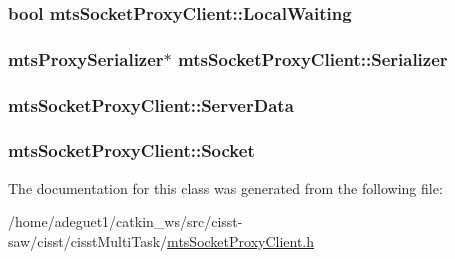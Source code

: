 \hypertarget{classmts_socket_proxy_client_ada937cdc99e0b2c41a569870908968b7}{
\subsubsection[{Local\-Waiting}]{\setlength{\rightskip}{0pt plus 5cm}bool mts\-Socket\-Proxy\-Client\-::\-Local\-Waiting\hspace{0.3cm}{\ttfamily [protected]}}}\label{classmts_socket_proxy_client_ada937cdc99e0b2c41a569870908968b7}
\hypertarget{classmts_socket_proxy_client_a3f2c24fb49a4fe8a38418792a607cab9}{
\subsubsection[{Serializer}]{\setlength{\rightskip}{0pt plus 5cm}mts\-Proxy\-Serializer$\ast$ mts\-Socket\-Proxy\-Client\-::\-Serializer\hspace{0.3cm}{\ttfamily [protected]}}}\label{classmts_socket_proxy_client_a3f2c24fb49a4fe8a38418792a607cab9}
\hypertarget{classmts_socket_proxy_client_aa9f989d86d2edd55f50c997b48ffcf74}{
\subsubsection[{Server\-Data}]{ mts\-Socket\-Proxy\-Client\-::\-Server\-Data\hspace{0.3cm}{\ttfamily [protected]}}}\label{classmts_socket_proxy_client_aa9f989d86d2edd55f50c997b48ffcf74}
\hypertarget{classmts_socket_proxy_client_a324fcc343989f521b7ccd1aa1fec63e9}{
\subsubsection[{Socket}]{ mts\-Socket\-Proxy\-Client\-::\-Socket\hspace{0.3cm}{\ttfamily [protected]}}}\label{classmts_socket_proxy_client_a324fcc343989f521b7ccd1aa1fec63e9}


The documentation for this class was generated from the following file\-:\begin{DoxyCompactItemize}
\item 
/home/adeguet1/catkin\-\_\-ws/src/cisst-\/saw/cisst/cisst\-Multi\-Task/\hyperlink{mts_socket_proxy_client_8h}{mts\-Socket\-Proxy\-Client.\-h}\end{DoxyCompactItemize}
